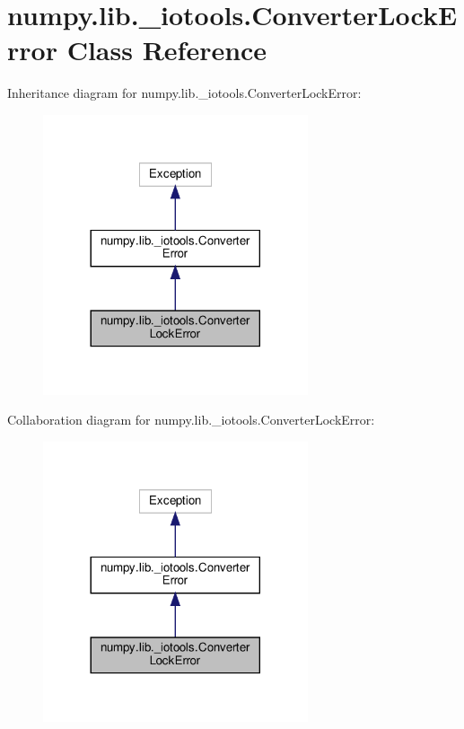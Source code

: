 \hypertarget{classnumpy_1_1lib_1_1__iotools_1_1ConverterLockError}{}\section{numpy.\+lib.\+\_\+iotools.\+Converter\+Lock\+Error Class Reference}
\label{classnumpy_1_1lib_1_1__iotools_1_1ConverterLockError}


Inheritance diagram for numpy.\+lib.\+\_\+iotools.\+Converter\+Lock\+Error\+:
\nopagebreak
\begin{figure}[H]
\begin{center}
\leavevmode
\includegraphics[width=221pt]{classnumpy_1_1lib_1_1__iotools_1_1ConverterLockError__inherit__graph}
\end{center}
\end{figure}


Collaboration diagram for numpy.\+lib.\+\_\+iotools.\+Converter\+Lock\+Error\+:
\nopagebreak
\begin{figure}[H]
\begin{center}
\leavevmode
\includegraphics[width=221pt]{classnumpy_1_1lib_1_1__iotools_1_1ConverterLockError__coll__graph}
\end{center}
\end{figure}


